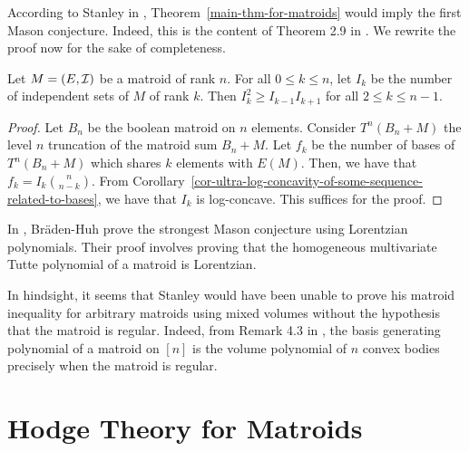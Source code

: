 \documentclass{puthesis-UG}
\begin{document}
According to Stanley in \cite{STANLEY}, Theorem~\ref{main-thm-for-matroids} would imply the first Mason conjecture. Indeed, this is the content of Theorem 2.9 in \cite{STANLEY}. We rewrite the proof now for the sake of completeness. 

\begin{thm}
	Let $M = (E, \mathcal{I})$ be a matroid of rank $n$. For all $0 \leq k \leq n$, let $I_k$ be the number of independent sets of $M$ of rank $k$. Then $I_k^2 \geq I_{k-1} I_{k+1}$ for all $2 \leq k \leq n-1$. 
\end{thm}

\begin{proof}
	Let $B_n$ be the boolean matroid on $n$ elements. Consider $T^n (B_n + M)$ the level $n$ truncation of the matroid sum $B_n + M$. Let $f_k$ be the number of bases of $T^n(B_n + M)$ which shares $k$ elements with $E(M)$. Then, we have that $f_k = I_k \binom{n}{n-k}$. From Corollary~\ref{cor-ultra-log-concavity-of-some-sequence-related-to-bases}, we have that $I_k$ is log-concave. This suffices for the proof. 
\end{proof}

\begin{remark}
	In \cite{lorentzian-polynomials}, Br\"aden-Huh prove the strongest Mason conjecture using Lorentzian polynomials. Their proof involves proving that the homogeneous multivariate Tutte polynomial of a matroid is Lorentzian. 
\end{remark}

\begin{remark}
	In hindsight, it seems that Stanley would have been unable to prove his matroid inequality for arbitrary matroids using mixed volumes without the hypothesis that the matroid is regular. Indeed, from Remark 4.3 in \cite{lorentzian-polynomials}, the basis generating polynomial of a matroid on $[n]$ is the volume polynomial of $n$ convex bodies precisely when the matroid is regular.
\end{remark}

\chapter{Hodge Theory for Matroids} \label{chap:hodge-theory-for-matroids}
\end{document}

